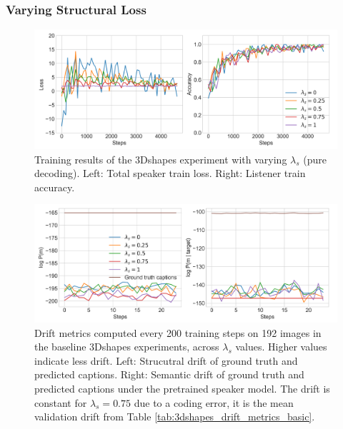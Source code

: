 \subsubsection{Varying Structural Loss}

\begin{figure}
	\centering
	\includegraphics[width=\linewidth]{images/shapes_refgame_49_pure_losses_all_Ls_random.png}
	\caption{Training results of the 3Dshapes experiment with varying $\lambda_s$ (pure decoding). Left: Total speaker train loss. Right: Listener train accuracy.}
	\label{fig:3dshapes_baseline_speaker_loss_listener_acc_all}
\end{figure}


\begin{figure}
	\centering
	\includegraphics[width=\linewidth]{images/shapes_structural_semantic_drift_49_pure_L_s_all_random.png}
	\caption{Drift metrics computed every 200 training steps on 192 images in the baseline 3Dshapes experiments, across $\lambda_s$ values. Higher values indicate less drift. Left: Strucutral drift of ground truth and predicted captions. Right: Semantic drift of ground truth and predicted captions under the pretrained speaker model. The drift is constant for $\lambda_s = 0.75$ due to a coding error, it is the mean validation drift from Table \ref{tab:3dshapes_drift_metrics_basic}.} 
	\label{fig:3dshapes_baseline_all_str_sem_drift}
\end{figure}

